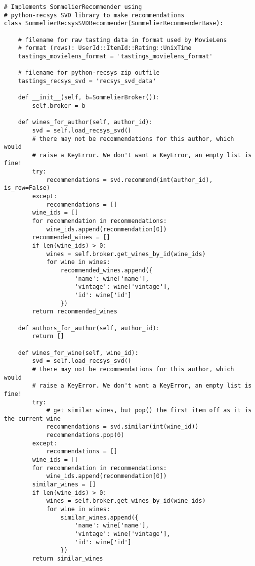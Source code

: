 \begin{verbatim}
# Implements SommelierRecommender using 
# python-recsys SVD library to make recommendations
class SommelierRecsysSVDRecommender(SommelierRecommenderBase):

    # filename for raw tasting data in format used by MovieLens
    # format (rows): UserId::ItemId::Rating::UnixTime
    tastings_movielens_format = 'tastings_movielens_format'

    # filename for python-recsys zip outfile
    tastings_recsys_svd = 'recsys_svd_data'

    def __init__(self, b=SommelierBroker()):
        self.broker = b

    def wines_for_author(self, author_id):
        svd = self.load_recsys_svd()
        # there may not be recommendations for this author, which would
        # raise a KeyError. We don't want a KeyError, an empty list is fine!
        try:
            recommendations = svd.recommend(int(author_id), is_row=False)
        except:
            recommendations = []
        wine_ids = []
        for recommendation in recommendations:
            wine_ids.append(recommendation[0])
        recommended_wines = []
        if len(wine_ids) > 0:
            wines = self.broker.get_wines_by_id(wine_ids)
            for wine in wines:
                recommended_wines.append({
                    'name': wine['name'],
                    'vintage': wine['vintage'],
                    'id': wine['id']
                })
        return recommended_wines

    def authors_for_author(self, author_id):
        return []

    def wines_for_wine(self, wine_id):
        svd = self.load_recsys_svd()
        # there may not be recommendations for this author, which would
        # raise a KeyError. We don't want a KeyError, an empty list is fine!
        try:
            # get similar wines, but pop() the first item off as it is the current wine
            recommendations = svd.similar(int(wine_id))
            recommendations.pop(0)
        except:
            recommendations = []
        wine_ids = []
        for recommendation in recommendations:
            wine_ids.append(recommendation[0])
        similar_wines = []
        if len(wine_ids) > 0:
            wines = self.broker.get_wines_by_id(wine_ids)
            for wine in wines:
                similar_wines.append({
                    'name': wine['name'],
                    'vintage': wine['vintage'],
                    'id': wine['id']
                })
        return similar_wines


\end{verbatim}
